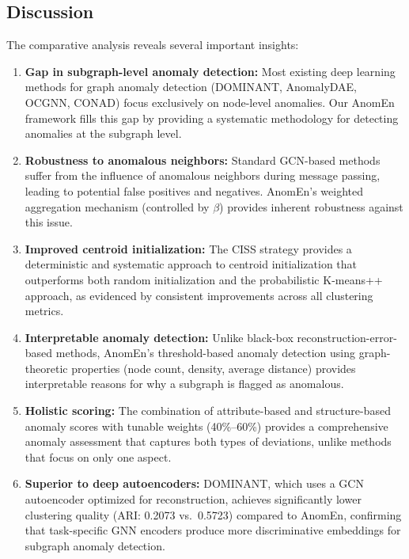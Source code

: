 \subsection{Discussion}

The comparative analysis reveals several important insights:

\begin{enumerate}
    \item \textbf{Gap in subgraph-level anomaly detection:} Most existing deep learning methods for graph anomaly detection (DOMINANT, AnomalyDAE, OCGNN, CONAD) focus exclusively on node-level anomalies. Our AnomEn framework fills this gap by providing a systematic methodology for detecting anomalies at the subgraph level.

    \item \textbf{Robustness to anomalous neighbors:} Standard GCN-based methods suffer from the influence of anomalous neighbors during message passing, leading to potential false positives and negatives. AnomEn's weighted aggregation mechanism (controlled by $\beta$) provides inherent robustness against this issue.

    \item \textbf{Improved centroid initialization:} The CISS strategy provides a deterministic and systematic approach to centroid initialization that outperforms both random initialization and the probabilistic K-means++ approach, as evidenced by consistent improvements across all clustering metrics.

    \item \textbf{Interpretable anomaly detection:} Unlike black-box reconstruction-error-based methods, AnomEn's threshold-based anomaly detection using graph-theoretic properties (node count, density, average distance) provides interpretable reasons for why a subgraph is flagged as anomalous.

    \item \textbf{Holistic scoring:} The combination of attribute-based and structure-based anomaly scores with tunable weights (40\%--60\%) provides a comprehensive anomaly assessment that captures both types of deviations, unlike methods that focus on only one aspect.

    \item \textbf{Superior to deep autoencoders:} DOMINANT, which uses a GCN autoencoder optimized for reconstruction, achieves significantly lower clustering quality (ARI: 0.2073 vs.\ 0.5723) compared to AnomEn, confirming that task-specific GNN encoders produce more discriminative embeddings for subgraph anomaly detection.
\end{enumerate}

